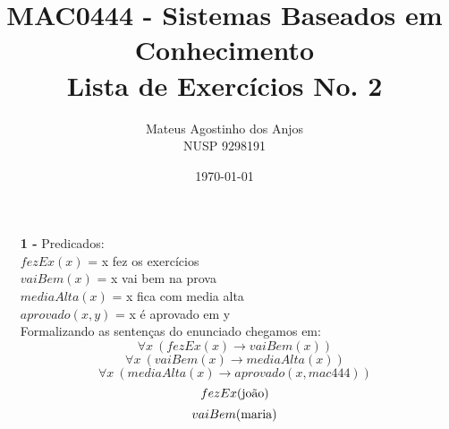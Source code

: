 \documentclass[12pt]{article}
\title{MAC0444 - Sistemas Baseados em Conhecimento \\
Lista de Exercícios No. 2
}
\author{Mateus Agostinho dos Anjos\\NUSP 9298191}
\date{\today}
\begin{document}
	\maketitle
	\begin{itemize}
		\item[\textbf{1 -}]
			\hfill\newline
			Predicados:\\
			$fezEx(x)$ = x fez os exercícios\\
			$vaiBem(x)$ = x vai bem na prova\\
			$mediaAlta(x)$ = x fica com media alta\\
			$aprovado(x, y)$ = x é aprovado em y \\
			\newline
			Formalizando as sentenças do enunciado chegamos em:\\
			$$\forall x \ (fezEx(x) \rightarrow vaiBem(x))$$
			$$\forall x \ (vaiBem(x) \rightarrow mediaAlta(x))$$
			$$\forall x \ (mediaAlta(x) \rightarrow aprovado(x, mac444))$$
			$$fezEx(\textnormal{joão})$$
			$$vaiBem(\textnormal{maria})$$
	\end{itemize}
\end{document}

